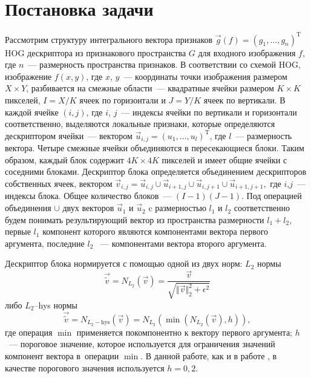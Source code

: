 \documentclass[12pt,twoside]{article}
\begin{document}
\section{Постановка задачи}
Рассмотрим структуру интегрального вектора признаков $\vec{g}(f) = (g_{1},\dots , g_{n})^{\mathrm{T}}$ HOG дескриптора \cite{dalaltriggs2005} из признакового пространства $G$ для входного изображения $f$, где $n$~--- размерность пространства признаков. В соответствии со схемой
HOG, изображение $f(x,y)$, где $x$, $y$~--– координаты точки изображения размером $X\times Y$, разбивается на смежные области~--– квадратные ячейки размером $K\times K$ пикселей, $I=X/K$ ячеек по горизонтали и $J=Y/K$ ячеек по вертикали. 
В каждой ячейке $(i,j)$, где $i$, $j$~--- индексы ячейки по вертикали 	и горизонтали соответственно, выделяются локальные признаки, которые определяются дескриптором ячейки~--- вектором $\vec{u}_{i,j} = (u_1, \dots , u_l)^{\mathrm{T}}$, где $l$~---	размерность вектора. Четыре смежные ячейки объединяются в пересекающиеся блоки. Таким образом, каждый блок содержит $4K \times 4K$ пикселей и имеет общие ячейки с соседними блоками. Дескриптор блока определяется объединением дескрипторов собственных ячеек, вектором $\vec{v}_{i,j} = \vec{u}_{i,j}\cup\vec{u}_{i+1,j}\cup\vec{u}_{i,j+1}
	\cup\vec{u}_{i+1,j+1},$ где $i$,$j$~--- индексы блока.
	Общее количество блоков~--- $(I-1)(J-1)$. Под операцией
	объединения $\cup$ двух векторов $\vec{u}_{1}$ и $\vec{u}_{2}$
	c размерностью $l_{1}$ и $l_{2}$ соответственно будем понимать результирующий вектор из пространства размерности $l_{1}+l_{2}$, первые $l_{1}$ компонент которого являются компонентами вектора первого аргумента, последние $l_{2}$ ~--- компонентами вектора второго аргумента.
	
	 Дескриптор блока нормируется с помощью одной из двух норм:
		 $L_2$ нормы
\begin{equation*}
	\vec{\tilde{v}} = N_{L_{2}}(\vec{v}) =  \frac{\vec{v}}{\sqrt{\Vert \vec{v} \Vert_{2}^{2} + \epsilon^{2}}}
	\label{eq:L2}
\end{equation*}
либо $L_2$--hys нормы \cite{dalaltriggs2005}
\begin{equation*}
	\vec{\tilde{v}} = N_{L_{2}-\mathrm{hys}}(\vec{v}) =  N_{L_{2}}
	\left(\min(N_{L_{2}}(\vec{v}),h)\right),
	\label{eq:L2-hys}
\end{equation*}
где операция $\min$ применяется покомпонентно к вектору первого
аргумента; $h$~--- пороговое значение, которое используется для
ограничения значений компонент вектора в~операции $\min$. В данной работе, как и в работе \cite{dalaltriggs2005}, в качестве порогового значения используется $h=0{,}2$.
\end{document}
